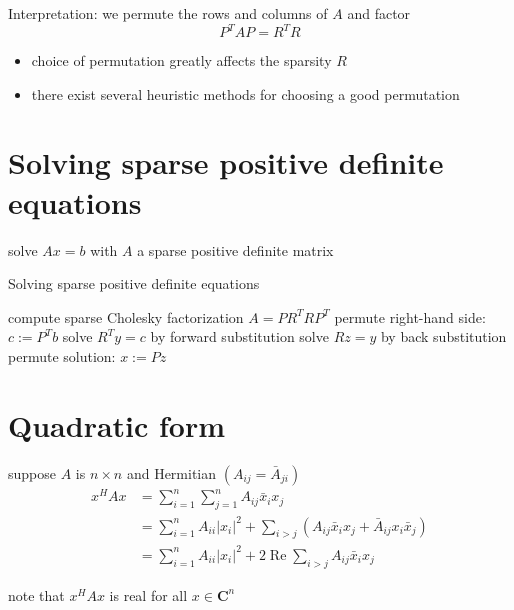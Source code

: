 Interpretation: we permute the rows and columns of $ A $ and factor
\begin{equation}
P^{T} A P=R^{T} R
\end{equation}

\begin{itemize}
    \item choice of permutation greatly affects the sparsity $ R $
    \item there exist several heuristic methods for choosing a good permutation
\end{itemize}


\section{Solving sparse positive definite equations}

solve $ A x=b $ with $ A $ a sparse positive definite matrix

\begin{algorithm}
    \caption{Solving sparse positive definite equations}
    compute sparse Cholesky factorization $ A=P R^{T} R P^{T} $\;
    permute right-hand side: $ c:=P^{T} b $\;
    solve $ R^{T} y=c $ by forward substitution\;
    solve $ R z=y $ by back substitution\;
    permute solution: $ x:=P z $\;
\end{algorithm}

\section{Quadratic form}

\begin{theorem}
    suppose $A$ is $n \times n$ and Hermitian $\left(A_{i j}=\bar{A}_{j i}\right)$
\begin{equation}
\begin{aligned}
x^{H} A x &=\sum_{i=1}^{n} \sum_{j=1}^{n} A_{i j} \bar{x}_{i} x_{j} \\
&=\sum_{i=1}^{n} A_{i i}\left|x_{i}\right|^{2}+\sum_{i>j}\left(A_{i j} \bar{x}_{i} x_{j}+\bar{A}_{i j} x_{i} \bar{x}_{j}\right) \\
&=\sum_{i=1}^{n} A_{i i}\left|x_{i}\right|^{2}+2 \operatorname{Re} \sum_{i>j} A_{i j} \bar{x}_{i} x_{j}
\end{aligned}
\end{equation}
\end{theorem}

\begin{remark}
    note that $x^{H} A x$ is real for all $x \in \mathbf{C}^{n}$
\end{remark}




